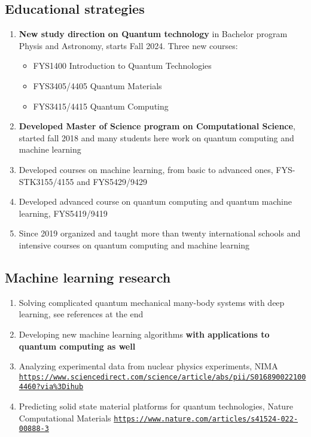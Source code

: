 \documentclass[%
oneside,                 %
final,                   %
10pt]{article}
\begin{document}
\subsection{Educational strategies}

\begin{enumerate}
\item \textbf{New study direction on Quantum technology} in Bachelor program Physis and Astronomy, starts Fall 2024. Three new courses:
\begin{itemize}

  \item FYS1400 Introduction to Quantum Technologies

  \item FYS3405/4405 Quantum Materials

  \item FYS3415/4415 Quantum Computing

\end{itemize}

\noindent
\item \textbf{Developed Master of Science program on Computational Science}, started fall  2018 and many students here work on quantum computing and machine learning

\item Developed courses on machine learning, from basic to advanced ones, FYS-STK3155/4155 and FYS5429/9429

\item Developed advanced course on quantum computing and quantum machine learning, FYS5419/9419

\item Since 2019 organized and taught more than twenty  international schools and intensive courses on quantum computing and machine learning
\end{enumerate}

\noindent
\subsection{Machine learning research}

\begin{enumerate}
\item Solving complicated quantum mechanical many-body systems with deep learning, see references at the end

\item Developing new machine learning algorithms \textbf{with applications to quantum computing as well}

\item Analyzing experimental data from nuclear physics experiments, NIMA \href{{https://www.sciencedirect.com/science/article/abs/pii/S0168900221004460?via%

\item Predicting solid state material platforms for quantum technologies, Nature Computational Materials \href{{https://www.nature.com/articles/s41524-022-00888-3}}{\nolinkurl{https://www.nature.com/articles/s41524-022-00888-3}} 
\end{enumerate}
\end{document}
